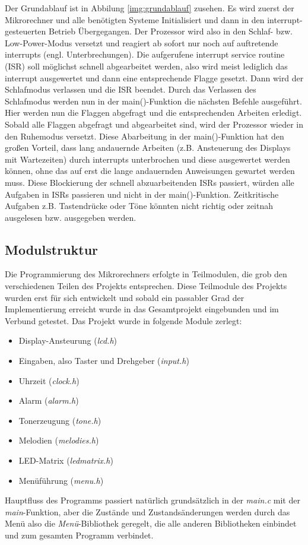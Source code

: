 \newline
Der Grundablauf ist in Abbilung \ref{img:grundablauf} zusehen. Es wird zuerst der Mikrorechner und alle benötigten Systeme Initialisiert und dann in den interrupt-gesteuerten Betrieb Übergegangen. Der Prozessor wird also in den Schlaf- bzw. Low-Power-Modus versetzt und reagiert ab sofort nur noch auf auftretende interrupts (engl. Unterbrechungen). Die aufgerufene interrupt service routine (ISR) soll möglichst schnell abgearbeitet werden, also wird meist lediglich das interrupt ausgewertet und dann eine entsprechende Flagge gesetzt. Dann wird der Schlafmodus verlassen und die ISR beendet. Durch das Verlassen des Schlafmodus werden nun in der main()-Funktion die nächsten Befehle ausgeführt. Hier werden nun die Flaggen abgefragt und die entsprechenden Arbeiten erledigt. Sobald alle Flaggen abgefragt und abgearbeitet sind, wird der Prozessor wieder in den Ruhemodus versetzt. Diese Abarbeitung in der main()-Funktion hat den großen Vorteil, dass lang andauernde Arbeiten (z.B. Ansteuerung des Displays mit Wartezeiten) durch interrupts unterbrochen und diese ausgewertet werden können, ohne das auf erst die lange andauernden Anweisungen gewartet werden muss. Diese Blockierung der schnell abzuarbeitenden ISRs passiert, würden alle Aufgaben in ISRs passieren und nicht in der main()-Funktion. Zeitkritische Aufgaben z.B. Tastendrücke oder Töne könnten nicht richtig oder zeitnah ausgelesen bzw. ausgegeben werden.

\subsection{Modulstruktur}
Die Programmierung des Mikrorechners erfolgte in Teilmodulen, die grob den verschiedenen Teilen des Projekts entsprechen. Diese Teilmodule des Projekts wurden erst für sich entwickelt und sobald ein passabler Grad der Implementierung erreicht wurde in das Gesamtprojekt eingebunden und im Verbund getestet. Das Projekt wurde in folgende Module zerlegt:
\begin{itemize}
	\item Display-Ansteurung (\textsl{lcd.h})
	\item Eingaben, also Taster und Drehgeber (\textsl{input.h})
	\item Uhrzeit (\textsl{clock.h})
	\item Alarm (\textsl{alarm.h})
	\item Tonerzeugung (\textsl{tone.h})
	\item Melodien (\textsl{melodies.h})
	\item LED-Matrix (\textsl{ledmatrix.h})
	\item Menüführung (\textsl{menu.h})
\end{itemize}
Hauptfluss des Programms passiert natürlich grundsätzlich in der \textsl{main.c} mit der \textsl{main}-Funktion, aber die Zustände und Zustandsänderungen werden durch das Menü also die \textsl{Menü}-Bibliothek geregelt, die alle anderen Bibliotheken einbindet und zum gesamten Programm verbindet.

